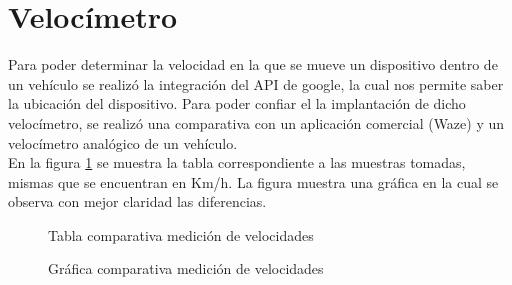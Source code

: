
\section{Velocímetro}
Para poder determinar la velocidad en la que se mueve un dispositivo dentro de un vehículo se realizó la integración del API de google, la cual nos permite saber la ubicación del dispositivo. Para poder confiar el la implantación de dicho velocímetro, se realizó una comparativa con un aplicación comercial (Waze) y un velocímetro analógico de un vehículo.\\

En la figura \ref{fig:Tvelocidad} se muestra la tabla correspondiente a las muestras tomadas, mismas que se encuentran en Km/h. La figura muestra una gráfica en la cual se observa con mejor claridad las diferencias.





\begin{figure}[htbp!]
	\centering
	\caption{Tabla comparativa medición de velocidades}
	\label{fig:Tvelocidad}
\end{figure}
\begin{figure}[htbp!]
	\centering
	\caption{Gráfica comparativa medición de velocidades}
	\label{fig:GraficaWIA}
\end{figure}



 